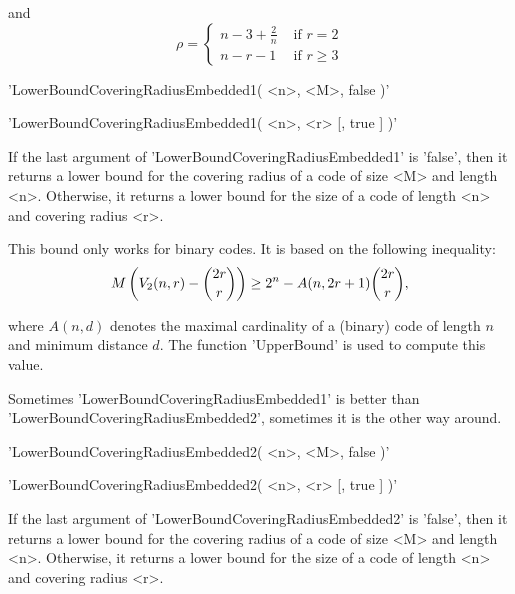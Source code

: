 and
\begin{equation}
    \rho = \left\{
   \begin{array}{ll}
   n-3+\frac{2}{n} & \mbox{  if $r = 2$} \\
        n-r-1           & \mbox{  if $r \geq 3$}
   \end{array}
    \right.
\end{equation}




'LowerBoundCoveringRadiusEmbedded1( <n>, <M>, false )'

'LowerBoundCoveringRadiusEmbedded1( <n>, <r> [, true ] )'

If the last argument of 'LowerBoundCoveringRadiusEmbedded1' is
'false', then it returns a lower bound for the covering radius of a
code of size <M> and length <n>.
Otherwise, it returns a lower bound for the size of a code of length
<n> and covering radius <r>.

This bound only works for binary codes.
It is based on the following inequality:
\begin{equation}
    M \left( V_2(n,r) - {{2r} \choose {r}} \right) \geq
    2^n - A( n, 2r+1 ) {{2r} \choose {r}},
\end{equation}

where $A(n,d)$ denotes the maximal cardinality of a (binary) code
of length $n$ and minimum distance $d$.
The function 'UpperBound' is used to compute this value.

Sometimes 'LowerBoundCoveringRadiusEmbedded1' is better than\\
'LowerBoundCoveringRadiusEmbedded2', sometimes it is the other
way around.




'LowerBoundCoveringRadiusEmbedded2( <n>, <M>, false )'

'LowerBoundCoveringRadiusEmbedded2( <n>, <r> [, true ] )'

If the last argument of 'LowerBoundCoveringRadiusEmbedded2' is
'false', then it returns a lower bound for the covering radius of a
code of size <M> and length <n>.
Otherwise, it returns a lower bound for the size of a code of length
<n> and covering radius <r>.

